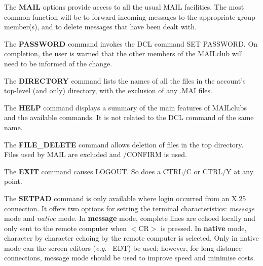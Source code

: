 The {\bf MAIL} options provide access to all the usual MAIL
facilities.  The most common function will be to forward
incoming messages to the appropriate group member(s), and
to delete messages that have been dealt with.

The {\bf PASSWORD} command invokes the DCL command SET PASSWORD.
On completion, the user is warned that the other members of the
MAILclub will need to be informed of the change.

The {\bf DIRECTORY} command lists the names of all the files in
the account's top-level (and only) directory, with the exclusion
of any .MAI files.

The {\bf HELP} command displays a summary of the main features of
MAILclubs and the available commands.  It is not related to the DCL
command of the same name.

The {\bf FILE\_DELETE} command allows deletion of files in the top
directory. Files used by MAIL are excluded and /CONFIRM is used.

The {\bf EXIT} command causes LOGOUT.  So does a CTRL/C or
CTRL/Y at any point.

The {\bf SETPAD} command is only available where login occurred from
an X.25 connection.  It offers two options for setting the
terminal characteristics: {\it message} mode and {\it native}
mode.  In {\bf message} mode,
complete lines are echoed locally and only sent to the remote
computer when $<$CR$>$ is pressed.  In {\bf native}
mode, character by
character echoing by the remote computer is selected.  Only in
native mode can the screen editors ({\it e.g.\ } EDT) be used;  however,
for long-distance connections, message mode should be used to
improve speed and minimise costs.



                                                                                                                                                                                                                                                                                